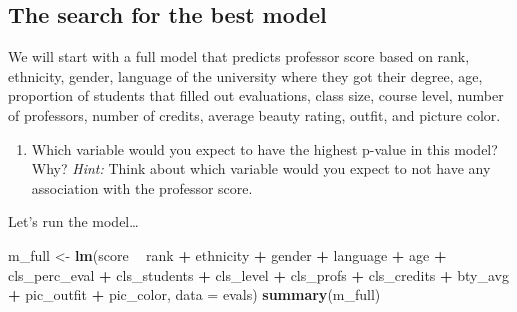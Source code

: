 \documentclass[
]{article}
\newenvironment{Shaded}{\begin{snugshade}}{\end{snugshade}}
\newcommand{\DataTypeTok}[1]{\textcolor[rgb]{0.13,0.29,0.53}{#1}}
\newcommand{\KeywordTok}[1]{\textcolor[rgb]{0.13,0.29,0.53}{\textbf{#1}}}
\newcommand{\NormalTok}[1]{#1}
\newcommand{\OperatorTok}[1]{\textcolor[rgb]{0.81,0.36,0.00}{\textbf{#1}}}
\newcommand{\StringTok}[1]{\textcolor[rgb]{0.31,0.60,0.02}{#1}}
\providecommand{\tightlist}{%
  \setlength{\itemsep}{0pt}\setlength{\parskip}{0pt}}
\begin{document}
\hypertarget{the-search-for-the-best-model}{%
\subsection{The search for the best
model}\label{the-search-for-the-best-model}}

We will start with a full model that predicts professor score based on
rank, ethnicity, gender, language of the university where they got their
degree, age, proportion of students that filled out evaluations, class
size, course level, number of professors, number of credits, average
beauty rating, outfit, and picture color.

\begin{enumerate}
\def\labelenumi{\arabic{enumi}.}
\setcounter{enumi}{10}
\tightlist
\item
  Which variable would you expect to have the highest p-value in this
  model? Why? \emph{Hint:} Think about which variable would you expect
  to not have any association with the professor score.
\end{enumerate}

Let's run the model\ldots{}

\begin{Shaded}
\begin{Highlighting}[]
\NormalTok{m_full <-}\StringTok{ }\KeywordTok{lm}\NormalTok{(score }\OperatorTok{~}\StringTok{ }\NormalTok{rank }\OperatorTok{+}\StringTok{ }\NormalTok{ethnicity }\OperatorTok{+}\StringTok{ }\NormalTok{gender }\OperatorTok{+}\StringTok{ }\NormalTok{language }\OperatorTok{+}\StringTok{ }\NormalTok{age }\OperatorTok{+}\StringTok{ }\NormalTok{cls_perc_eval }
             \OperatorTok{+}\StringTok{ }\NormalTok{cls_students }\OperatorTok{+}\StringTok{ }\NormalTok{cls_level }\OperatorTok{+}\StringTok{ }\NormalTok{cls_profs }\OperatorTok{+}\StringTok{ }\NormalTok{cls_credits }\OperatorTok{+}\StringTok{ }\NormalTok{bty_avg }
             \OperatorTok{+}\StringTok{ }\NormalTok{pic_outfit }\OperatorTok{+}\StringTok{ }\NormalTok{pic_color, }\DataTypeTok{data =}\NormalTok{ evals)}
\KeywordTok{summary}\NormalTok{(m_full)}
\end{Highlighting}
\end{Shaded}
\end{document}

